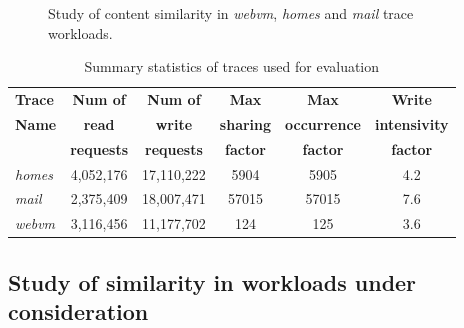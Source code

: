 \begin{figure}[t]
	\hfill\null
    \caption{Study of content similarity in \textit{webvm}, \textit{homes} and \textit{mail} trace workloads.} %
\vspace{-0.1in}
\label{fig:similarity-distrib}
\end{figure}

\begin{table}
\centering
\caption{Summary statistics of traces used for evaluation}
\begin{tabular}{|l|c|c|c|c|c|} \hline
\textbf{Trace} & \textbf{Num of} & \textbf{Num of} & \textbf{Max} & \textbf{Max} & \textbf{Write} \\
\textbf{Name} & \textbf{read} & \textbf{write} & \textbf{sharing} & \textbf{occurrence} & \textbf{intensivity} \\
\textbf{} & \textbf{requests} & \textbf{requests} & \textbf{factor} & \textbf{factor} & \textbf{factor}  \\ \hline
\textit{homes} & 4,052,176 & 17,110,222 & 5904 & 5905 & 4.2 \\ \hline
\textit{mail} & 2,375,409 & 18,007,471 & 57015 & 57015 & 7.6 \\ \hline
\textit{webvm} & 3,116,456 & 11,177,702 & 124 & 125 & 3.6 \\ \hline
\end{tabular}
\label{tab:stat-summary}
\end{table}

\subsection{Study of similarity in workloads under consideration}
\label{sec:similarity-study}

